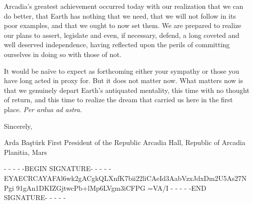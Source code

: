 Arcadia's greatest achievement occurred today with our realization that we can do better, that Earth has nothing that we need, that we will not follow in its poor examples, and that we ought to now set them. We are prepared to realize our plans to assert, legislate and even, if necessary, defend, a long coveted and well deserved independence, having reflected upon the perils of committing ourselves in doing so with those of not.

It would be naïve to expect as forthcoming either your sympathy or those you have long acted in proxy for. But it does not matter now. What matters now is that we genuinely depart Earth's antiquated mentality, this time with no thought of return, and this time to realize the dream that carried us here in the first place. {\it Per ardua ad astra.}

Sincerely, 

\hskip 1cm 
   
Arda Baştürk
First President of the Republic
Arcadia Hall, Republic of Arcadia Planitia, Mars

- - - - -BEGIN SIGNATURE- - - - -
EYAECRCAYAFAl6wk2gACgkQLXnfK7bii22liCAeId3AabVzxJdxDm2U5As27NPgi
91gAn1DKIZGjtwcPb+lMp6LVgm3iCFPG
=VA/I
- - - - -END SIGNATURE- - - - -
\stoplines

